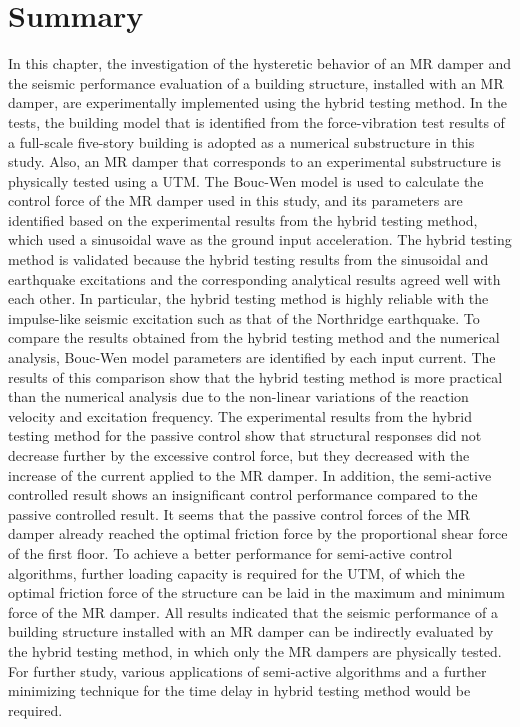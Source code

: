 \section{Summary}
In this chapter, the investigation of the hysteretic behavior of an MR damper and the seismic performance evaluation of a building structure, installed with an MR damper, are experimentally implemented using the hybrid testing method. In the tests, the building model that is identified from the force-vibration test results of a full-scale five-story building is adopted as a numerical substructure in this study. Also, an MR damper that corresponds to an experimental substructure is physically tested using a UTM. The Bouc-Wen model is used to calculate the control force of the MR damper used in this study, and its parameters are identified based on the experimental results from the hybrid testing method, which used a sinusoidal wave as the ground input acceleration. The hybrid testing method is validated because the hybrid testing results from the sinusoidal and earthquake excitations and the corresponding analytical results agreed well with each other. In particular, the hybrid testing method is highly reliable with the impulse-like seismic excitation such as that of the Northridge earthquake. To compare the results obtained from the hybrid testing method and the numerical analysis, Bouc-Wen model parameters are identified by each input current. The results of this comparison show that the hybrid testing method is more practical than the numerical analysis due to the non-linear variations of the reaction velocity and excitation frequency. The experimental results from the hybrid testing method for the passive control show that structural responses did not decrease further by the excessive control force, but they decreased with the increase of the current applied to the MR damper. In addition, the semi-active controlled result shows an insignificant control performance compared to the passive controlled result. It seems that the passive control forces of the MR damper already reached the optimal friction force by the proportional shear force of the first floor. To achieve a better performance for semi-active control algorithms, further loading capacity is required for the UTM, of which the optimal friction force of the structure can be laid in the maximum and minimum force of the MR damper. All results indicated that the seismic performance of a building structure installed with an MR damper can be indirectly evaluated by the hybrid testing method, in which only the MR dampers are physically tested. For further study, various applications of semi-active algorithms and a further minimizing technique for the time delay in hybrid testing method would be required.